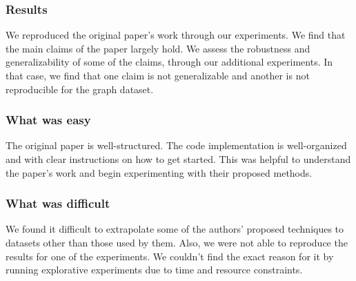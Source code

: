 \subsubsection{Results}
We reproduced the original paper's work through our experiments. We find that the main claims of the paper largely hold. We assess the robustness and generalizability of some of the claims, through our additional experiments. In that case, we find that one claim is not generalizable and another is not reproducible for the graph dataset.



\subsubsection*{What was easy}
The original paper is well-structured. The code implementation is well-organized and with clear instructions on how to get started. This was helpful to understand the paper's work and begin experimenting with their proposed methods.

\subsubsection*{What was difficult}
We found it difficult to extrapolate some of the authors' proposed techniques to datasets other than those used by them.  Also, we were not able to reproduce the results for one of the experiments. We couldn't find the exact reason for it by running explorative experiments due to time and resource constraints. 

